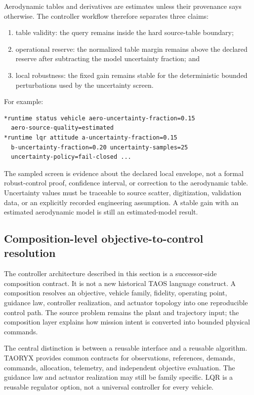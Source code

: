 \documentclass[11pt]{article}
\begin{document}
Aerodynamic tables and derivatives are estimates unless their provenance says
otherwise. The controller workflow therefore separates three claims:

\begin{enumerate}
  \item table validity: the query remains inside the hard source-table
    boundary;
  \item operational reserve: the normalized table margin remains above the
    declared reserve after subtracting the model uncertainty fraction; and
  \item local robustness: the fixed gain remains stable for the deterministic
    bounded perturbations used by the uncertainty screen.
\end{enumerate}

For example:

\begin{lstlisting}
*runtime status vehicle aero-uncertainty-fraction=0.15
  aero-source-quality=estimated
*runtime lqr attitude a-uncertainty-fraction=0.15
  b-uncertainty-fraction=0.20 uncertainty-samples=25
  uncertainty-policy=fail-closed ...
\end{lstlisting}

The sampled screen is evidence about the declared local envelope, not a formal
robust-control proof, confidence interval, or correction to the aerodynamic
table. Uncertainty values must be traceable to source scatter, digitization,
validation data, or an explicitly recorded engineering assumption. A stable
gain with an estimated aerodynamic model is still an estimated-model result.

\subsection{Composition-level objective-to-control resolution}
\label{subsec:composition-control-resolution}

The controller architecture described in this section is a successor-side
composition contract. It is not a new historical TAOS language construct. A
composition resolves an objective, vehicle family, fidelity, operating point,
guidance law, controller realization, and actuator topology into one
reproducible control path. The source problem remains the plant and trajectory
input; the composition layer explains how mission intent is converted into
bounded physical commands.

The central distinction is between a reusable interface and a reusable
algorithm. TAORYX provides common contracts for observations, references,
demands, commands, allocation, telemetry, and independent objective
evaluation. The guidance law and actuator realization may still be family
specific. LQR is a reusable regulator option, not a universal controller for
every vehicle.
\end{document}
